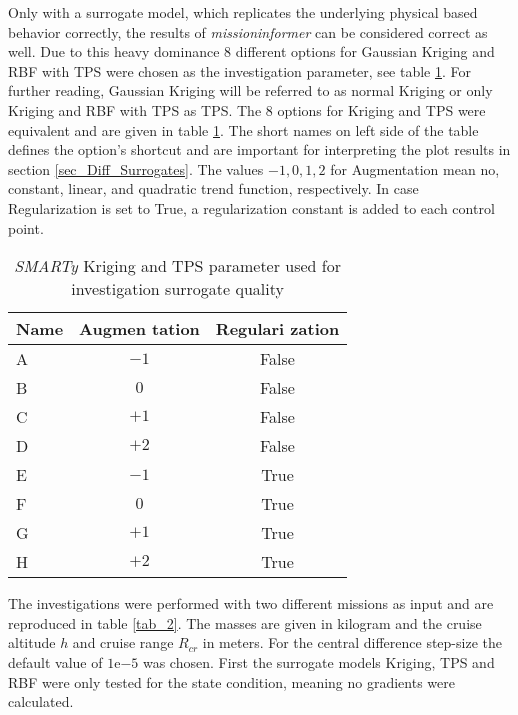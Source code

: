 Only with a surrogate model, which 
replicates the underlying physical based 
behavior correctly, the results of \emph{missioninformer} 
can be considered correct as well.
Due to this 
heavy dominance $8$ different options for 
Gaussian Kriging and RBF with TPS
were chosen as the investigation parameter, 
see table \ref{tab_3}. 
For further reading, Gaussian Kriging will 
be referred to as normal Kriging or 
only Kriging and 
RBF with TPS as TPS.
The $8$ options 
for Kriging and TPS  were equivalent and are given in 
table \ref{tab_3}. The short names on left side 
of the table defines the option's shortcut and are important 
for interpreting
the plot results in section \ref{sec_Diff_Surrogates}.
The values $-1,0,1,2$ for Augmentation mean
no, constant, linear, and quadratic trend function, 
respectively. In case Regularization is set 
to True, a regularization constant is added
to each control point.\newline

\begin{table}[!htb]
    \centering
    \begin{tabular}{l c c }
        \multicolumn{1}{p{2cm}}{\textbf{Name}} &  \multicolumn{1}{p{2cm}}{\textbf{Augmen \newline tation}} 
            &  \multicolumn{1}{p{2cm}}{\textbf{Regulari \newline zation}}\\
            \hline
            A & $-1$ &False \\
            B & $0$ &False \\
            C & $+1$ &False \\
            D & $+2$ &False \\
            E & $-1$ &True \\
            F & $0$ &True \\
            G & $+1$ &True \\
            H & $+2$ &True \\
        \end{tabular}
        \caption{\emph{SMARTy} Kriging and TPS parameter used for investigation 
        surrogate quality}
        \label{tab_3}
\end{table} 

\FloatBarrier
The investigations were performed 
with two different missions as input and 
are reproduced in table \ref{tab_2}. The masses 
are given in kilogram and the 
cruise altitude $h$ and cruise range $R_{cr}$
in meters. For the central difference step-size the default value 
of $1\mathrm{e}{-5}$ was chosen.  
First the surrogate models Kriging, TPS and RBF 
were only tested for the state condition, meaning 
no gradients were calculated.

